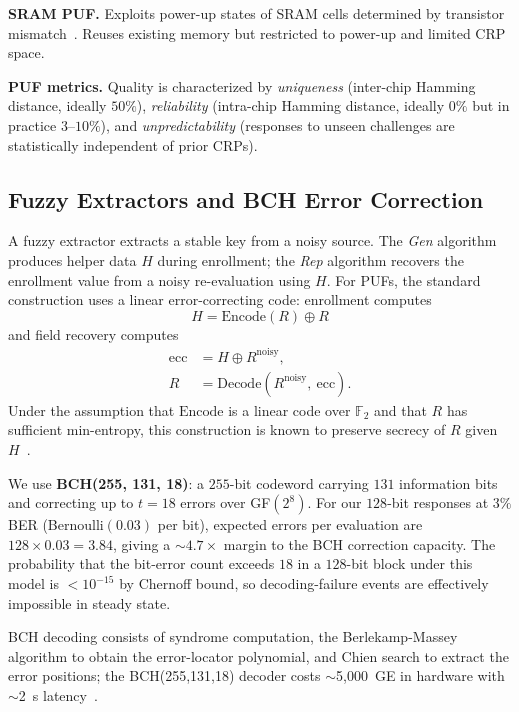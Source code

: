 \documentclass[journal,a4paper,10pt]{IEEEtran}
\begin{document}
\textbf{SRAM PUF.} Exploits power-up states of SRAM cells determined
by transistor mismatch~\cite{sram_puf_bch}. Reuses existing memory
but restricted to power-up and limited CRP space.

\textbf{PUF metrics.} Quality is characterized by \emph{uniqueness}
(inter-chip Hamming distance, ideally $50\%$), \emph{reliability}
(intra-chip Hamming distance, ideally $0\%$ but in practice
$3$--$10\%$), and \emph{unpredictability} (responses to unseen
challenges are statistically independent of prior CRPs).

\subsection{Fuzzy Extractors and BCH Error Correction}
A fuzzy extractor extracts a stable key from a noisy source. The
\emph{Gen} algorithm produces helper data $H$ during enrollment; the
\emph{Rep} algorithm recovers the enrollment value from a noisy
re-evaluation using $H$. For PUFs, the standard construction uses a
linear error-correcting code: enrollment computes
\begin{equation}
H = \mathrm{Encode}(R) \oplus R
\label{eq:gen}
\end{equation}
and field recovery computes
\begin{align}
\mathrm{ecc} &= H \oplus R^{\mathrm{noisy}}, \\
R &= \mathrm{Decode}(R^{\mathrm{noisy}},\ \mathrm{ecc}).
\end{align}
Under the assumption that $\mathrm{Encode}$ is a linear code over
$\mathbb{F}_2$ and that $R$ has sufficient min-entropy, this
construction is known to preserve secrecy of $R$ given
$H$~\cite{helper_data_masking}.

We use \textbf{BCH(255, 131, 18)}: a $255$-bit codeword carrying $131$
information bits and correcting up to $t{=}18$ errors over GF$(2^8)$.
For our $128$-bit responses at $3\%$ BER (Bernoulli$(0.03)$ per bit),
expected errors per evaluation are $128 \times 0.03 = 3.84$, giving a
$\sim 4.7\times$ margin to the BCH correction capacity. The probability
that the bit-error count exceeds $18$ in a $128$-bit block under this
model is $< 10^{-15}$ by Chernoff bound, so decoding-failure events
are effectively impossible in steady state.

BCH decoding consists of syndrome computation, the Berlekamp-Massey
algorithm to obtain the error-locator polynomial, and Chien search to
extract the error positions; the BCH(255,131,18) decoder costs
$\sim$5{,}000~GE in hardware with $\sim$2~\textmu s
latency~\cite{sram_puf_bch}.
\end{document}
